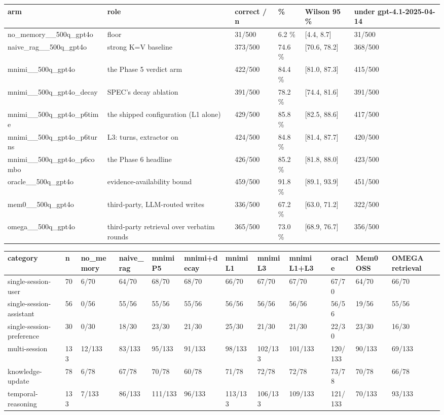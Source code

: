 
\begin{tabular}{llllll}
\toprule
arm & role & correct / n & \% & Wilson 95 \% & under gpt-4.1-2025-04-14 \\
\midrule
no\_memory\_\_500q\_gpt4o & floor & 31/500 & 6.2 \% & [4.4, 8.7] & 31/500 \\
naive\_rag\_\_500q\_gpt4o & strong K=V baseline & 373/500 & 74.6 \% & [70.6, 78.2] & 368/500 \\
mnimi\_\_500q\_gpt4o & the Phase 5 verdict arm & 422/500 & 84.4 \% & [81.0, 87.3] & 415/500 \\
mnimi\_\_500q\_gpt4o\_decay & SPEC's decay ablation & 391/500 & 78.2 \% & [74.4, 81.6] & 391/500 \\
mnimi\_\_500q\_gpt4o\_p6time & the shipped configuration (L1 alone) & 429/500 & 85.8 \% & [82.5, 88.6] & 417/500 \\
mnimi\_\_500q\_gpt4o\_p6turns & L3: turns, extractor on & 424/500 & 84.8 \% & [81.4, 87.7] & 420/500 \\
mnimi\_\_500q\_gpt4o\_p6combo & the Phase 6 headline & 426/500 & 85.2 \% & [81.8, 88.0] & 423/500 \\
oracle\_\_500q\_gpt4o & evidence-availability bound & 459/500 & 91.8 \% & [89.1, 93.9] & 451/500 \\
mem0\_\_500q\_gpt4o & third-party, LLM-routed writes & 336/500 & 67.2 \% & [63.0, 71.2] & 322/500 \\
omega\_\_500q\_gpt4o & third-party retrieval over verbatim rounds & 365/500 & 73.0 \% & [68.9, 76.7] & 356/500 \\
\bottomrule
\end{tabular}

\begin{tabular}{llllllllllll}
\toprule
category & n & no\_memory & naive\_rag & mnimi P5 & mnimi+decay & mnimi L1 & mnimi L3 & mnimi L1+L3 & oracle & Mem0 OSS & OMEGA retrieval \\
\midrule
single-session-user & 70 & 6/70 & 64/70 & 68/70 & 68/70 & 66/70 & 67/70 & 67/70 & 67/70 & 64/70 & 66/70 \\
single-session-assistant & 56 & 0/56 & 55/56 & 55/56 & 55/56 & 56/56 & 56/56 & 56/56 & 56/56 & 19/56 & 55/56 \\
single-session-preference & 30 & 0/30 & 18/30 & 23/30 & 21/30 & 25/30 & 21/30 & 21/30 & 22/30 & 23/30 & 16/30 \\
multi-session & 133 & 12/133 & 83/133 & 95/133 & 91/133 & 98/133 & 102/133 & 101/133 & 120/133 & 90/133 & 69/133 \\
knowledge-update & 78 & 6/78 & 67/78 & 70/78 & 60/78 & 71/78 & 72/78 & 72/78 & 73/78 & 70/78 & 66/78 \\
temporal-reasoning & 133 & 7/133 & 86/133 & 111/133 & 96/133 & 113/133 & 106/133 & 109/133 & 121/133 & 70/133 & 93/133 \\
\bottomrule
\end{tabular}

